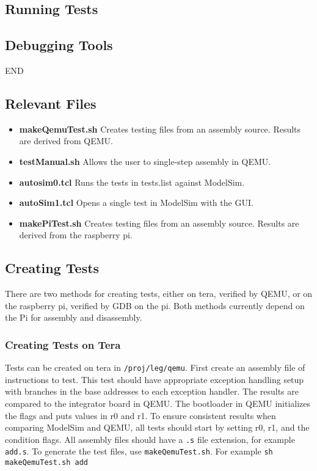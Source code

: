 \subsection{Running Tests}

\subsection{Debugging Tools}

END

\subsection{Relevant Files}
\begin{itemize}
\item \textbf{makeQemuTest.sh} Creates testing files from an assembly source. Results are derived from QEMU. 
\item \textbf{testManual.sh} Allows the user to single-step assembly in QEMU. 
\item \textbf{autosim0.tcl} Runs the tests in tests.list against ModelSim. 
\item \textbf{autoSim1.tcl} Opens a single test in ModelSim with the GUI. 
\item \textbf{makePiTest.sh} Creates testing files from an assembly source. Results are derived from the raspberry pi. 
\end{itemize}

\subsection{Creating Tests}
There are two methods for creating tests, either on tera, verified by QEMU, or on the raspberry pi, verified by GDB on the pi. Both methods currently depend on the Pi for assembly and disassembly. 
\subsubsection{Creating Tests on Tera}
Tests can be created on tera in \texttt{/proj/leg/qemu}. 
First create an assembly file of instructions to test. 
This test should have appropriate exception handling setup with branches in the base addresses to each exception handler. 
The results are compared to the integrator board in QEMU. 
The bootloader in QEMU initializes the flags and puts values in r0 and r1. 
To ensure consistent results when comparing ModelSim and QEMU, all tests should start by setting r0, r1, and the condition flags. 
All assembly files should have a \texttt{.s} file extension, for example \texttt{add.s}. To generate the test files, use \texttt{makeQemuTest.sh}. 
For example \texttt{sh makeQemuTest.sh add}

